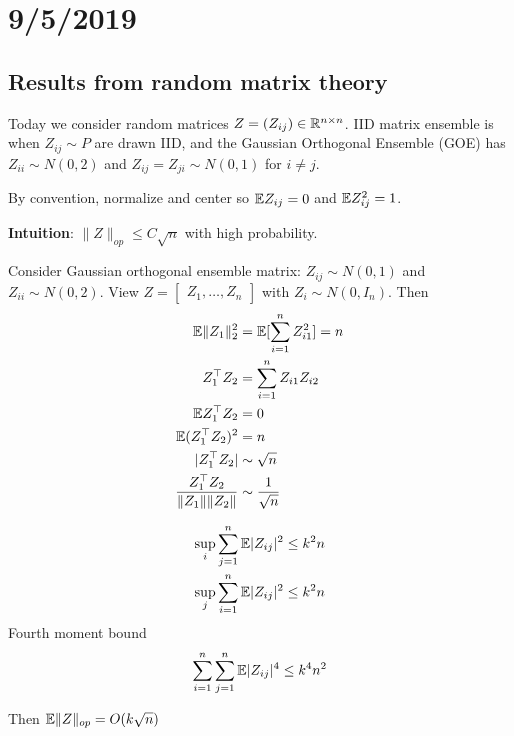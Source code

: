 \section{9/5/2019}

\subsection{Results from random matrix theory}

Today we consider random matrices $Z = (Z_{ij}) \in \mathbb{R}^{n \times n}$.
IID matrix ensemble is when $Z_{ij} \sim P$ are drawn IID, and the
Gaussian Orthogonal Ensemble (GOE) has $Z_{ii} \sim N(0,2)$
and $Z_{ij} = Z_{ji} \sim N(0,1)$ for $i \neq j$.

By convention, normalize and center so $\mathbb{E} Z_{ij} = 0$ and $\mathbb{E} Z_{ij}^2 = 1$.

\textbf{Intuition}: $\|Z\|_{op} \leq C \sqrt{n}$ with high probability.

Consider Gaussian orthogonal ensemble matrix: $Z_{ij} \sim N(0,1)$ and $Z_{ii}
\sim N(0,2)$. View $Z = \begin{bmatrix} Z_1, \ldots, Z_n \end{bmatrix}$
with $Z_i \sim N(0, I_n)$. Then
\begin{align}
  \mathbb{E} \|Z_1\|_2^2 &= \mathbb{E}[ \sum_{i=1}^n Z_{i1}^2 ] = n \\
  Z_1^\top Z_2 &= \sum_{i=1}^n Z_{i1} Z_{i2} \\
  \mathbb{E} Z_1^\top Z_2 &= 0 \\
  \mathbb{E} (Z_1^\top Z_2)^2 &= n \\
  \lvert Z_1^\top Z_2\rvert &\sim \sqrt{n} \\
  \frac{Z_1^\top Z_2}{\|Z_1\| \|Z_2\|} &\sim \frac{1}{\sqrt{n}}
\end{align}

\begin{theorem}
  \begin{align}
    \sup_i \sum_{j=1}^n \mathbb{E} \lvert Z_{ij} \rvert^2 &\leq k^2 n \\
    \sup_j \sum_{i=1}^n \mathbb{E} \lvert Z_{ij} \rvert^2 &\leq k^2 n
  \end{align}
  Fourth moment bound
  \begin{align}
    \sum_{i=1}^n \sum_{j=1}^n \mathbb{E}\lvert Z_{ij}\rvert^4 \leq k^4 n^2
  \end{align}

  Then $\mathbb{E} \|Z\|_{op} = O(k \sqrt{n})$
\end{theorem}

